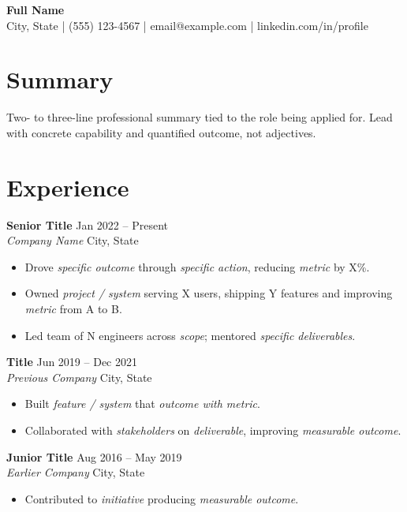 \documentclass[11pt,a4paper]{article}
\newcommand{\entry}[4]{%
    \noindent\textbf{#1} \hfill #2 \\
    \textit{#3} \hfill #4%
}
\begin{document}
\begin{center}
    {\LARGE\bfseries Full Name} \\[0.3em]
    City, State \quad | \quad (555) 123-4567 \quad | \quad email@example.com \quad | \quad linkedin.com/in/profile
\end{center}

\section{Summary}

Two- to three-line professional summary tied to the role being applied for. Lead with concrete capability and quantified outcome, not adjectives.

\section{Experience}

\entry{Senior Title}{Jan 2022 -- Present}{Company Name}{City, State}
\begin{itemize}[leftmargin=1.5em, itemsep=0.2em, topsep=0.3em]
    \item Drove \textit{specific outcome} through \textit{specific action}, reducing \textit{metric} by X\%.
    \item Owned \textit{project / system} serving X users, shipping Y features and improving \textit{metric} from A to B.
    \item Led team of N engineers across \textit{scope}; mentored \textit{specific deliverables}.
\end{itemize}

\vspace{0.5em}

\entry{Title}{Jun 2019 -- Dec 2021}{Previous Company}{City, State}
\begin{itemize}[leftmargin=1.5em, itemsep=0.2em, topsep=0.3em]
    \item Built \textit{feature / system} that \textit{outcome with metric}.
    \item Collaborated with \textit{stakeholders} on \textit{deliverable}, improving \textit{measurable outcome}.
\end{itemize}

\vspace{0.5em}

\entry{Junior Title}{Aug 2016 -- May 2019}{Earlier Company}{City, State}
\begin{itemize}[leftmargin=1.5em, itemsep=0.2em, topsep=0.3em]
    \item Contributed to \textit{initiative} producing \textit{measurable outcome}.
\end{itemize}
\end{document}
